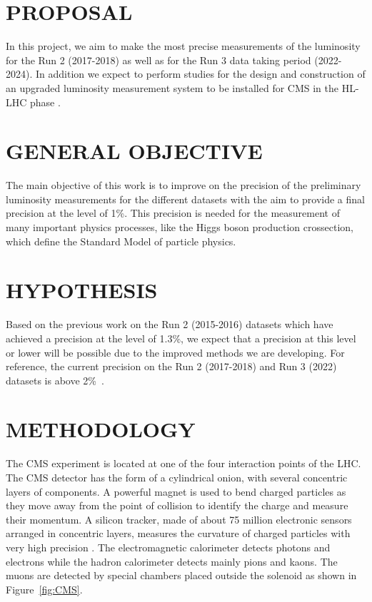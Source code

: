 \documentclass[final,12p]{article}
\begin{document}
\section{PROPOSAL}

In this project, we aim to make the most precise measurements of the luminosity for the Run 2 (2017-2018) as well as for the Run 3 data taking period (2022-2024).
In addition we expect to perform studies for the design and construction of an upgraded luminosity measurement system to be installed for CMS in the HL-LHC phase \cite{Collaboration:2706512}.


\section{GENERAL OBJECTIVE}

The main objective of this work is to improve on the precision of the preliminary luminosity measurements for the different datasets with the aim to provide a final precision at the level of 1\%.
This precision is needed for the measurement of many important physics processes, like the Higgs boson production crossection, which define the Standard Model of particle physics. 

\section{HYPOTHESIS}

Based on the previous work on the Run 2 (2015-2016) datasets which have achieved a precision at the level of 1.3\%, we expect that a precision at this level or lower will be possible due to the improved methods we are developing.
For reference, the current precision on the Run 2 (2017-2018) and Run 3 (2022) datasets is above 2\%~\cite{Sirunyan:2021qkt}. 



\section{METHODOLOGY}


The CMS experiment is located at one of the four interaction points of the LHC.
The CMS detector has the form of a cylindrical onion, with several concentric layers of components.
A powerful magnet is used to bend charged particles as they move away from the point of collision to identify the charge and measure their momentum.
A silicon tracker, made of about 75 million electronic sensors arranged in concentric layers, measures the curvature of charged particles with very high precision \cite{Chatrchyan:2008aa}.
The electromagnetic calorimeter detects photons and electrons while the hadron calorimeter detects mainly pions and kaons.
The muons are detected by special chambers placed outside the solenoid as shown in Figure~\ref{fig:CMS}.
\end{document}
